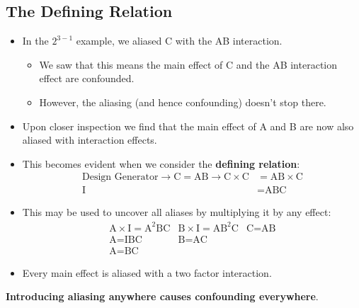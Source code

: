 \subsection{The Defining Relation}
\begin{itemize}
      \item In the $ 2^{3-1} $ example, we aliased C with the AB interaction.
            \begin{itemize}
                  \item We saw that this means the main effect of C and the AB interaction effect are confounded.
                  \item However, the aliasing (and hence confounding) doesn't stop there.
            \end{itemize}
\end{itemize}
\begin{itemize}[*]
      \item Upon closer inspection we find that the main effect of A and B are now also aliased with interaction
            effects.
\end{itemize}
\begin{itemize}
      \item This becomes evident when we consider the \textbf{defining relation}:
            \begin{align*}
                  \text{Design Generator}\rightarrow\text{C}=\text{AB}\rightarrow \text{C}\times\text{C} & =\text{AB}\times\text{C} \\
                  \text{I}                                                                               & =\text{ABC}
            \end{align*}
      \item This may be used to uncover all aliases by multiplying it by any effect:
            \[ \begin{array}{ccc}
                        \text{A}\times\text{I}=\text{A}^2\text{BC} & \text{B}\times\text{I}=\text{A}\text{B}^2\text{C} & \text{C}=\text{AB} \\
                        \text{A}=\text{IBC}                        & \text{B}=\text{AC}                                                     \\
                        \text{A}=\text{BC}
                  \end{array} \]
      \item Every main effect is aliased with a two factor interaction.
\end{itemize}
\begin{framed}
      \begin{tightcenter}
            \textbf{Introducing aliasing anywhere causes confounding everywhere}.
      \end{tightcenter}
\end{framed}
